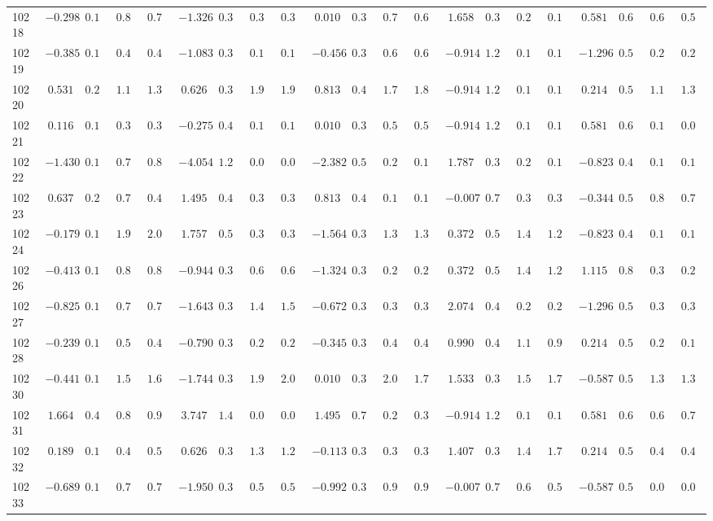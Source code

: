 \documentclass[6pt]{article}
\begin{document}
\begin{landscape}
{\begin{longtable}{lrrrrrrrrrrrrrrrrrrrr}
10218&$-0.298$&$0.172$&$0.812$&$0.794$&$-1.326$&$0.343$&$0.387$&$0.387$&$ 0.010$&$0.363$&$0.740$&$0.683$&$ 1.658$&$0.376$&$0.227$&$0.198$&$ 0.581$&$0.677$&$0.632$&$0.507$\tabularnewline
10219&$-0.385$&$0.170$&$0.454$&$0.427$&$-1.083$&$0.364$&$0.171$&$0.174$&$-0.456$&$0.337$&$0.676$&$0.666$&$-0.914$&$1.254$&$0.135$&$0.149$&$-1.296$&$0.509$&$0.275$&$0.263$\tabularnewline
10220&$ 0.531$&$0.227$&$1.140$&$1.367$&$ 0.626$&$0.393$&$1.926$&$1.943$&$ 0.813$&$0.497$&$1.707$&$1.863$&$-0.914$&$1.254$&$0.135$&$0.149$&$ 0.214$&$0.594$&$1.183$&$1.322$\tabularnewline
10221&$ 0.116$&$0.190$&$0.353$&$0.320$&$-0.275$&$0.402$&$0.110$&$0.109$&$ 0.010$&$0.363$&$0.579$&$0.523$&$-0.914$&$1.254$&$0.135$&$0.149$&$ 0.581$&$0.677$&$0.154$&$0.093$\tabularnewline
10222&$-1.430$&$0.190$&$0.779$&$0.811$&$-4.054$&$1.200$&$0.092$&$0.099$&$-2.382$&$0.505$&$0.215$&$0.148$&$ 1.787$&$0.385$&$0.258$&$0.195$&$-0.823$&$0.499$&$0.101$&$0.100$\tabularnewline
10223&$ 0.637$&$0.240$&$0.738$&$0.466$&$ 1.495$&$0.495$&$0.346$&$0.303$&$ 0.813$&$0.497$&$0.164$&$0.108$&$-0.007$&$0.714$&$0.316$&$0.348$&$-0.344$&$0.520$&$0.845$&$0.793$\tabularnewline
10224&$-0.179$&$0.176$&$1.965$&$2.040$&$ 1.757$&$0.553$&$0.376$&$0.354$&$-1.564$&$0.364$&$1.337$&$1.314$&$ 0.372$&$0.563$&$1.401$&$1.249$&$-0.823$&$0.499$&$0.101$&$0.100$\tabularnewline
10226&$-0.413$&$0.169$&$0.841$&$0.835$&$-0.944$&$0.376$&$0.610$&$0.685$&$-1.324$&$0.346$&$0.251$&$0.256$&$ 0.372$&$0.563$&$1.401$&$1.249$&$ 1.115$&$0.851$&$0.303$&$0.292$\tabularnewline
10227&$-0.825$&$0.167$&$0.743$&$0.729$&$-1.643$&$0.331$&$1.498$&$1.501$&$-0.672$&$0.332$&$0.324$&$0.321$&$ 2.074$&$0.423$&$0.205$&$0.235$&$-1.296$&$0.509$&$0.326$&$0.334$\tabularnewline
10228&$-0.239$&$0.174$&$0.522$&$0.406$&$-0.790$&$0.389$&$0.275$&$0.279$&$-0.345$&$0.341$&$0.448$&$0.464$&$ 0.990$&$0.414$&$1.138$&$0.983$&$ 0.214$&$0.594$&$0.256$&$0.188$\tabularnewline
10230&$-0.441$&$0.169$&$1.544$&$1.607$&$-1.744$&$0.331$&$1.999$&$2.063$&$ 0.010$&$0.363$&$2.000$&$1.786$&$ 1.533$&$0.373$&$1.534$&$1.752$&$-0.587$&$0.505$&$1.301$&$1.300$\tabularnewline
10231&$ 1.664$&$0.476$&$0.874$&$0.975$&$ 3.747$&$1.435$&$0.083$&$0.086$&$ 1.495$&$0.741$&$0.273$&$0.309$&$-0.914$&$1.254$&$0.135$&$0.149$&$ 0.581$&$0.677$&$0.678$&$0.730$\tabularnewline
10232&$ 0.189$&$0.195$&$0.477$&$0.528$&$ 0.626$&$0.393$&$1.330$&$1.273$&$-0.113$&$0.354$&$0.313$&$0.345$&$ 1.407$&$0.376$&$1.445$&$1.785$&$ 0.214$&$0.594$&$0.498$&$0.462$\tabularnewline
10233&$-0.689$&$0.166$&$0.712$&$0.715$&$-1.950$&$0.341$&$0.518$&$0.527$&$-0.992$&$0.333$&$0.935$&$0.941$&$-0.007$&$0.714$&$0.602$&$0.575$&$-0.587$&$0.505$&$0.042$&$0.043$\tabularnewline

\end{longtable}}
\end{landscape}
\end{document}
